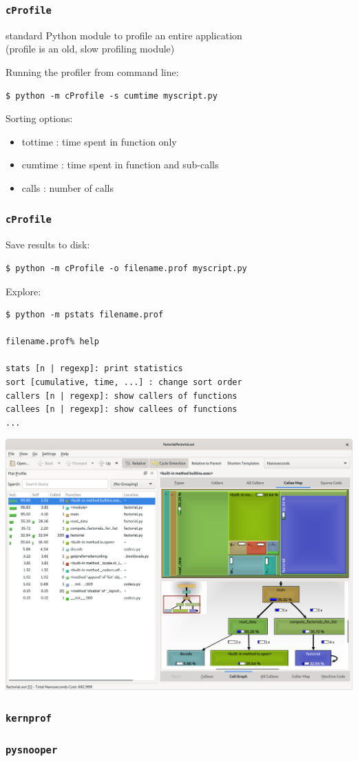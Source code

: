 \documentclass[serif]{beamer}
\begin{document}
\begin{frame}[fragile]
  \frametitle{\texttt{cProfile}}

  standard Python module to profile an entire application\\
  (profile is an old, slow profiling module)

  \bigskip

  Running the profiler from command line:
  \begin{verbatim}
$ python -m cProfile -s cumtime myscript.py
  \end{verbatim}

  \bigskip

  Sorting options:
  \begin{itemize}
    \item
      tottime : time spent in function only
    \item
      cumtime : time spent in function and sub-calls
    \item
      calls   : number of calls
  \end{itemize}
\end{frame}

\begin{frame}[fragile]
  \frametitle{\texttt{cProfile}}

  Save results to disk:
  \begin{verbatim}
$ python -m cProfile -o filename.prof myscript.py
  \end{verbatim}
  
  Explore:
  \begin{verbatim}
$ python -m pstats filename.prof

filename.prof% help

stats [n | regexp]: print statistics
sort [cumulative, time, ...] : change sort order
callers [n | regexp]: show callers of functions
callees [n | regexp]: show callees of functions
...
  \end{verbatim}
\end{frame}

\begin{frame}
  \includegraphics[width=\textwidth]{factorial/kcachegrind.png}
\end{frame}

\begin{frame}
  \frametitle{\texttt{kernprof}}

\end{frame}

\begin{frame}
  \frametitle{\texttt{pysnooper}}

\end{frame}
\end{document}
